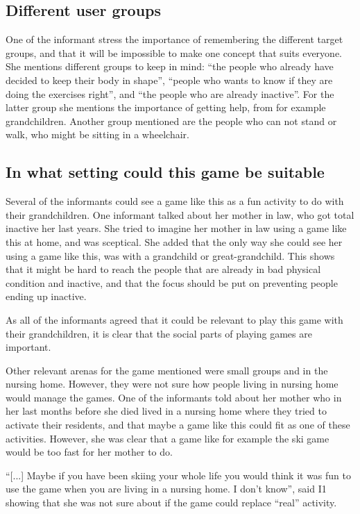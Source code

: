 \subsection{Different user groups}
One of the informant stress the importance of remembering the different target groups, and that it will be impossible to make one concept that suits everyone. She mentions different groups to keep in mind: “the people who already have decided to keep their body in shape”, “people who wants to know if they are doing the exercises right”, and “the people who are already inactive”. For the latter group she mentions the importance of getting help, from for example grandchildren.  Another group mentioned are the people who can not stand or walk, who might be sitting in a wheelchair. 

\subsection{In what setting could this game be suitable}
Several of the informants could see a game like this as a fun activity to do with their grandchildren. One informant talked about her mother in law, who got total inactive her last years. She tried to imagine her mother in law using a game like this at home, and was sceptical. She added that the only way she could see her using a game like this, was with a grandchild or great-grandchild. This shows that it might be hard to reach the people that are already in bad physical condition and inactive, and that the focus should be put on preventing people ending up inactive. 

As all of the informants agreed that it could be relevant to play this game with their grandchildren, it is clear that the social parts of playing games are important. 

Other relevant arenas for the game mentioned were small groups and in the nursing home. However, they were not sure how people living in nursing home would manage the games. One of the informants told about her mother who in her last months before she died lived in a nursing home where they tried to activate their residents, and that maybe a game like this could fit as one of these activities. However, she was clear that a  game like for example the ski game would be too fast for her mother to do. 

“[...] Maybe if you have been skiing your whole life you would think it was fun to use the game when you are living in a nursing home. I don't know”, said I1 showing that she was not sure about if the game could replace “real” activity. 

